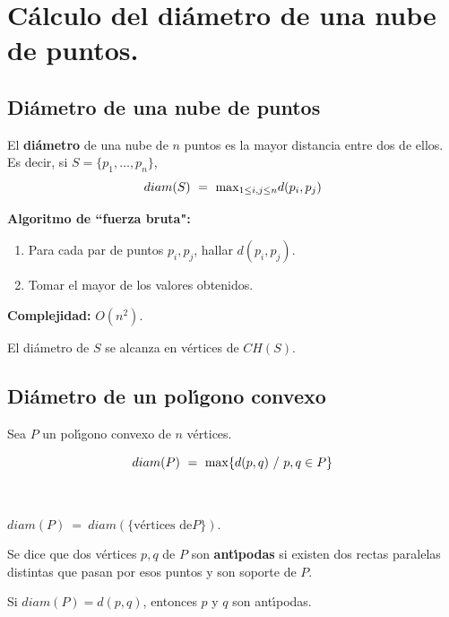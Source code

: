 \documentclass[twoside]{report}
\begin{document}
\section{C\'{a}lculo del di\'{a}metro de una nube de puntos.}

\subsection{Di\'{a}metro de una nube de puntos}

\begin{defi} El \textbf{di\'{a}metro} de una nube de $n$
puntos es la mayor distancia entre dos de ellos. Es decir, si
$S=\{p_1,\dots,p_n\}$, $$diam(S) \ = \ \displaystyle{{\rm max}_{1\leq i,j \leq
n}}d(p_i,p_j)$$
\end{defi}

{\bf Algoritmo de ``fuerza bruta":}

\begin{enumerate}
  \item Para cada par de puntos $p_i,p_j$, hallar $d(p_i,p_j)$.
  \item Tomar el mayor de los valores obtenidos.
\end{enumerate}

{\bf Complejidad:} $O(n^2)$.

\begin{prop} El di\'{a}metro de $S$ se alcanza en v\'{e}rtices
de $CH(S)$.
\end{prop}

\subsection{Di\'{a}metro de un pol\'{\i}gono convexo}

Sea $P$ un pol\'{\i}gono convexo de $n$ v\'{e}rtices.

 $$diam(P)\ = \ {\rm max}\{d(p,q)\ / \ p,q \in P\}$$

\

\begin{prop} $diam(P) \ = \  diam(\{\mbox{v\'{e}rtices de
}P\})$.
\end{prop}

\begin{defi} Se dice que dos v\'{e}rtices $p,q$ de $P$ son
\textbf{ant\'{\i}podas} si existen dos rectas paralelas distintas que
pasan por esos puntos y son soporte de $P$.
\end{defi}

\begin{prop} Si $diam(P)=d(p,q)$, entonces $p$ y $q$
son ant\'{\i}podas.
\end{prop}
\end{document}
